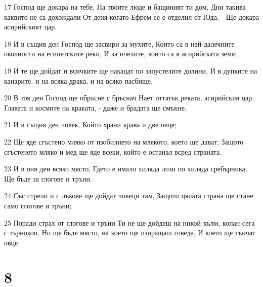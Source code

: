 \par 17 Господ ще докара на тебе, На твоите люде и бащиният ти дом, Дни такива каквито не са дохождали От деня когато Ефрем се е отделил от Юда, - Ще докара асирийският цар.
\par 18 И в същия ден Господ ще засвири за мухите, Които са в най-далечните околности на египетските реки, И за пчелите, които са в асирийската земя;
\par 19 И те ще дойдат и всичките ще накацат по запустелите долини, И в дупките на канарите, и на всяка драка, и на всяко пасбище.
\par 20 В тоя ден Господ ще обръсне с бръснач Нает оттатък реката, асирийския цар, Главата и космите на краката, - даже и брадата ще смъкне.
\par 21 И в същия ден човек, Който храни крава и две овце;
\par 22 Ще яде сгъстено мляко от изобилието на млякото, което ще дават; Защото сгъстеното мляко и мед ще яде всеки, който е останал всред страната.
\par 23 И в оня ден всяко място, Гдето е имало хиляда лози по хиляда сребърника, Ще бъде за глогове и тръни.
\par 24 Със стрели и с лъкове ще дойдат човеци там, Защото цялата страна ще стане само глогове и тръни;
\par 25 Поради страх от глогове и тръни Ти не ще дойдеш на никой хълм, копан сега с търнокоп, Но ще бъде място, на което ще изпращаш говеда, И което ще тъпчат овце.

\chapter{8}

